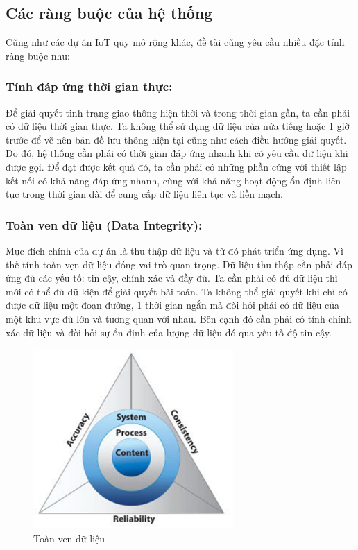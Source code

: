 \subsection{Các ràng buộc của hệ thống}
Cũng như các dự án IoT quy mô rộng khác, đề tài cũng yêu cầu nhiều đặc tính ràng buộc như:  
\subsubsection*{Tính đáp ứng thời gian thực:}Để giải quyết tình trạng giao thông hiện thời và trong thời gian gần, ta cần phải có dữ liệu thời gian thực. Ta không thể sử dụng dữ liệu của nửa tiếng hoặc 1 giờ trước để vẽ nên bản đồ lưu thông hiện tại cũng như cách điều hướng giải quyết. Do đó, hệ thống cần phải có thời gian đáp ứng nhanh khi có yêu cầu dữ liệu khi được gọi. Để đạt được kết quả đó, ta cần phải có những phần cứng với thiết lập kết nối có khả năng đáp ứng nhanh, cùng với khả năng hoạt động ổn định liên tục trong thời gian dài để cung cấp dữ liệu liên tục và liền mạch.


\subsubsection*{Toàn ven dữ liệu (Data Integrity):} Mục đích chính của dự án là thu thập dữ liệu và từ đó phát triển ứng dụng. Vì thế tính toàn vẹn dữ liệu đóng vai trò quan trọng. Dữ liệu thu thập cần phải đáp ứng đủ các yếu tố: tin cậy, chính xác và đầy đủ. Ta cần phải có đủ dữ liệu thì mới có thể đủ dữ kiện để giải quyết bài toán. Ta không thể giải quyết khi chỉ có được dữ liệu một đoạn đường, 1 thời gian ngắn mà đòi hỏi phải có dữ liệu của một khu vực đủ lớn và tương quan với nhau. Bên cạnh đó cần phải có tính chính xác dữ liệu và đòi hỏi sự ổn định của lượng dữ liệu đó qua yếu tố độ tin cậy. 
\begin{center}
\begin{figure}[htp]
\centering    
\includegraphics[width=3in]{toanvendulieu}
\caption[Toàn ven dữ liệu]{Toàn ven dữ liệu}
\label{fig:toanvendulieu}
\end{figure}
\end{center}

